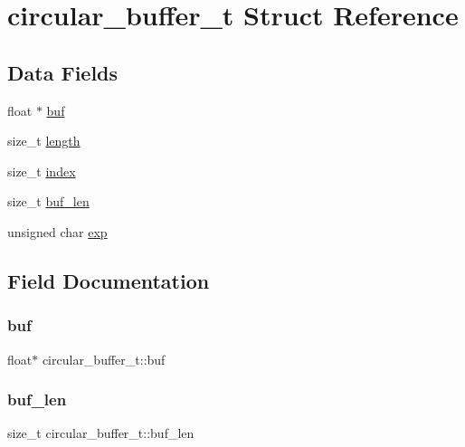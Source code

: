 \hypertarget{structcircular__buffer__t}{}\section{circular\+\_\+buffer\+\_\+t Struct Reference}
\label{structcircular__buffer__t}
\subsection*{Data Fields}
\begin{DoxyCompactItemize}
\item 
float $\ast$ \mbox{\hyperlink{structcircular__buffer__t_a05450b503674f101e5fa09fe2fe14d76}{buf}}
\item 
size\+\_\+t \mbox{\hyperlink{structcircular__buffer__t_ab00ef7eea313237690dfe2814951b9af}{length}}
\item 
size\+\_\+t \mbox{\hyperlink{structcircular__buffer__t_abf5dfce0f419464de0d19038065e88f5}{index}}
\item 
size\+\_\+t \mbox{\hyperlink{structcircular__buffer__t_a4eafcd801df588817b905950853704ff}{buf\+\_\+len}}
\item 
unsigned char \mbox{\hyperlink{structcircular__buffer__t_a6d2ad0faed1273fda0e34e0c4c1e010d}{exp}}
\end{DoxyCompactItemize}


\subsection{Field Documentation}
\mbox{\label{structcircular__buffer__t_a05450b503674f101e5fa09fe2fe14d76}} 
\subsubsection{\texorpdfstring{buf}{buf}}
{\footnotesize\ttfamily float$\ast$ circular\+\_\+buffer\+\_\+t\+::buf}

\mbox{\label{structcircular__buffer__t_a4eafcd801df588817b905950853704ff}} 
\subsubsection{\texorpdfstring{buf\+\_\+len}{buf\_len}}
{\footnotesize\ttfamily size\+\_\+t circular\+\_\+buffer\+\_\+t\+::buf\+\_\+len}

